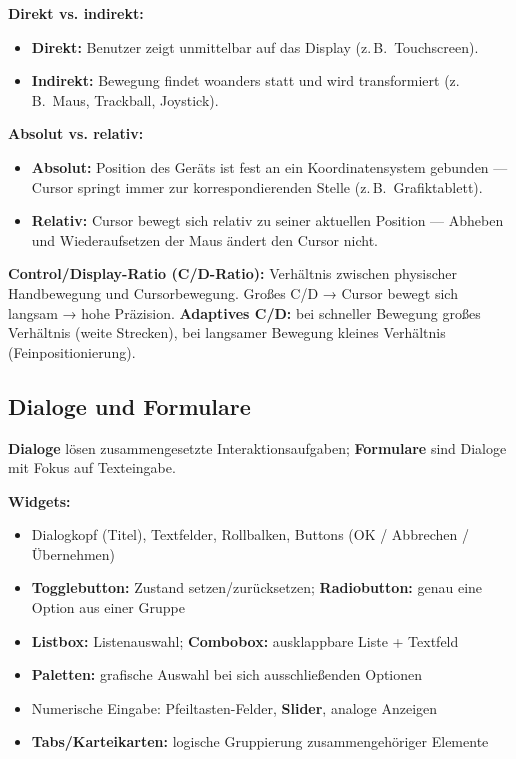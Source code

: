 \documentclass[12pt, a4paper]{article}
\begin{document}
\textbf{Direkt vs. indirekt:}
\begin{itemize}
  \item \textbf{Direkt:} Benutzer zeigt unmittelbar auf das Display (z.\,B.\ Touchscreen).
  \item \textbf{Indirekt:} Bewegung findet woanders statt und wird transformiert (z.\,B.\ Maus, Trackball, Joystick).
\end{itemize}

\textbf{Absolut vs. relativ:}
\begin{itemize}
  \item \textbf{Absolut:} Position des Geräts ist fest an ein Koordinatensystem gebunden — Cursor springt immer zur korrespondierenden Stelle (z.\,B.\ Grafiktablett).
  \item \textbf{Relativ:} Cursor bewegt sich relativ zu seiner aktuellen Position — Abheben und Wiederaufsetzen der Maus ändert den Cursor nicht.
\end{itemize}

\textbf{Control/Display-Ratio (C/D-Ratio):} Verhältnis zwischen physischer Handbewegung und Cursorbewegung. Großes C/D → Cursor bewegt sich langsam → hohe Präzision. \textbf{Adaptives C/D:} bei schneller Bewegung großes Verhältnis (weite Strecken), bei langsamer Bewegung kleines Verhältnis (Feinpositionierung).

\subsection{Dialoge und Formulare}

\textbf{Dialoge} lösen zusammengesetzte Interaktionsaufgaben; \textbf{Formulare} sind Dialoge mit Fokus auf Texteingabe.

\textbf{Widgets:}
\begin{itemize}
  \item Dialogkopf (Titel), Textfelder, Rollbalken, Buttons (OK / Abbrechen / Übernehmen)
  \item \textbf{Togglebutton:} Zustand setzen/zurücksetzen; \textbf{Radiobutton:} genau eine Option aus einer Gruppe
  \item \textbf{Listbox:} Listenauswahl; \textbf{Combobox:} ausklappbare Liste + Textfeld
  \item \textbf{Paletten:} grafische Auswahl bei sich ausschließenden Optionen
  \item Numerische Eingabe: Pfeiltasten-Felder, \textbf{Slider}, analoge Anzeigen
  \item \textbf{Tabs/Karteikarten:} logische Gruppierung zusammengehöriger Elemente
\end{itemize}
\end{document}
